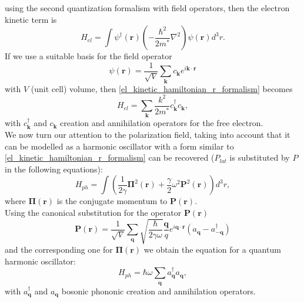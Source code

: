 using the second quantization formalism with field operators, then the electron kinetic term is
\begin{equation}
    H_{el}=\int\psi^\dagger(\mathbf{r})\left(-\frac{\hbar^2}{2m^*}\nabla^2\right)\psi(\mathbf{r})d^3r.
    \label{el_kinetic_hamiltonian_r_formalism}
\end{equation}
If we use a suitable basis for the field operator
\begin{equation}
    \psi(\mathbf{r})=\frac{1}{\sqrt{V}}\sum_\mathbf{k}c_\mathbf{k}e^{i\mathbf{k}\cdot\mathbf{r}}
    \label{from_r_to_k_electron_field_operator}
\end{equation}
with $V$ (unit cell) volume, then \ref{el_kinetic_hamiltonian_r_formalism} becomes
\begin{equation}
    H_{el}=\sum_\mathbf{k}\frac{k^2}{2m^*}c^\dagger_\mathbf{k}c_\mathbf{k},
    \label{el_kinetic_hamiltonian_k_formalism}
\end{equation}
with $c^\dagger_\mathbf{k}$ and $c_\mathbf{k}$ creation and annihilation operators for the free electron.\\
We now turn our attention to the polarization field, taking into account that it can be modelled as a harmonic oscillator with a 
form similar to \ref{el_kinetic_hamiltonian_r_formalism} can be recovered ($P_{lat}$ is substituted by $P$ in the following equations):
\begin{equation}
    H_{ph}=\int\left(\frac{1}{2\gamma}\mathbf{\Pi}^2(\mathbf{r})+\frac{\gamma}{2}\omega^2\mathbf{P}^2(\mathbf{r})\right)d^3r,
\end{equation}
where $\mathbf{\Pi}(\mathbf{r})$ is the conjugate momentum to $\mathbf{P}(\mathbf{r})$.\\
Using the canonical substitution for the operator $\mathbf{P}(\mathbf{r})$ 
\begin{equation}
    \mathbf{P}(\mathbf{r})=\frac{1}{\sqrt{V}}\sum_{\mathbf{q}}\sqrt{\frac{\hbar}{2\gamma\omega}}\frac{\mathbf{q}}{q}e^{i\mathbf{q}\cdot\mathbf{r}}(a_\mathbf{q}-a_\mathbf{-q}^\dagger)
     \label{P_expansion_quantum}
\end{equation}
and the corresponding one for $\mathbf{\Pi}(\mathbf{r})$ we obtain the equation for a quantum harmonic oscillator:
\begin{equation}
    H_{ph}=\hbar\omega\sum_\mathbf{q} a^\dagger_\mathbf{q}a_\mathbf{q},
\end{equation}
with $a^\dagger_\mathbf{q}$ and $a_\mathbf{q}$ bosonic phononic creation and annihilation operators.\\ 
